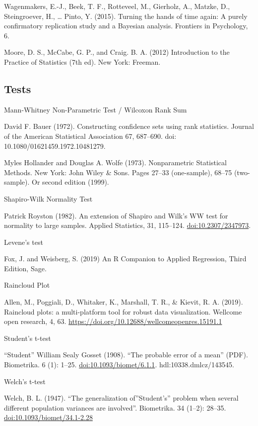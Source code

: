 \documentclass[
]{article}
\begin{document}
Wagenmakers, E.-J., Beek, T. F., Rotteveel, M., Gierholz, A., Matzke,
D., Steingroever, H., \ldots{} Pinto, Y. (2015). Turning the hands of
time again: A purely confirmatory replication study and a Bayesian
analysis. Frontiers in Psychology, 6.

Moore, D. S., McCabe, G. P., and Craig. B. A. (2012) Introduction to the
Practice of Statistics (7th ed). New York: Freeman.

\hypertarget{tests}{%
\subsection{Tests}\label{tests}}

Mann-Whitney Non-Parametric Test / Wilcoxon Rank Sum

David F. Bauer (1972). Constructing confidence sets using rank
statistics. Journal of the American Statistical Association 67,
687--690. doi: 10.1080/01621459.1972.10481279.

Myles Hollander and Douglas A. Wolfe (1973). Nonparametric Statistical
Methods. New York: John Wiley \& Sons. Pages 27--33 (one-sample), 68--75
(two-sample). Or second edition (1999).

Shapiro-Wilk Normality Test

Patrick Royston (1982). An extension of Shapiro and Wilk's WW test for
normality to large samples. Applied Statistics, 31, 115--124.
\url{doi:10.2307/2347973}.

Levene's test

Fox, J. and Weisberg, S. (2019) An R Companion to Applied Regression,
Third Edition, Sage.

Raincloud Plot

Allen, M., Poggiali, D., Whitaker, K., Marshall, T. R., \& Kievit, R. A.
(2019). Raincloud plots: a multi-platform tool for robust data
visualization. Wellcome open research, 4, 63.
\url{https://doi.org/10.12688/wellcomeopenres.15191.1}

Student's t-test

``Student'' William Sealy Gosset (1908). ``The probable error of a
mean'' (PDF). Biometrika. 6 (1): 1--25. \url{doi:10.1093/biomet/6.1.1}.
hdl:10338.dmlcz/143545.

Welch's t-test

Welch, B. L. (1947). ``The generalization of''Student's'' problem when
several different population variances are involved''. Biometrika. 34
(1--2): 28--35. \url{doi:10.1093/biomet/34.1-2.28}
\end{document}
